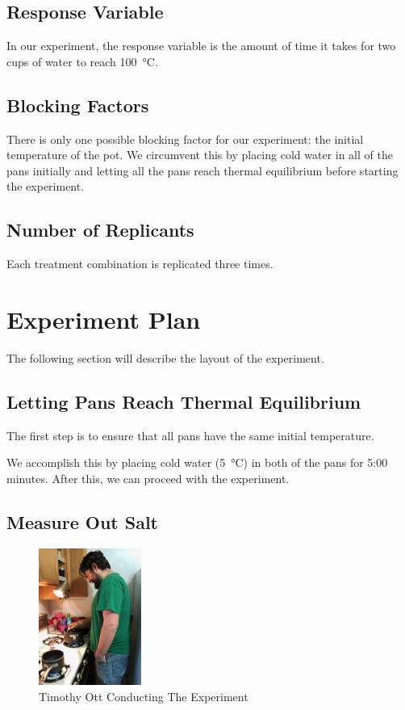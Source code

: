 \documentclass[12pt,titlepage=false]{scrartcl}
\begin{document}
\subsection{Response Variable}
\label{sub:response_variable}
In our experiment, the response variable is the amount of time it takes for two cups of water to reach \SI{100}{\degreeCelsius}.

\subsection{Blocking Factors}
\label{sub:blocking_factors}
There is only one possible blocking factor for our experiment: the initial temperature of the pot. We circumvent this by placing cold water in all of the pans initially and letting all the pans reach thermal equilibrium before starting the experiment.

\subsection{Number of Replicants}
\label{sub:number_of_replicants}
Each treatment combination is replicated three times.

\section{Experiment Plan}
\label{sec:experiment_plan}
The following section will describe the layout of the experiment.

\subsection{Letting Pans Reach Thermal Equilibrium}
\label{sub:letting_pans_reach_thermal_equilibrium}

The first step is to ensure that all pans have the same initial temperature.

We accomplish this by placing cold water (\SI{5}{\degreeCelsius}) in both of the pans for 5:00 minutes. After this, we can proceed with the experiment.

\subsection{Measure Out Salt}
\label{sub:measure_out_salt}
\begin{figure}
    \begin{center}
        \includegraphics[width=0.30\textwidth]{tim}
    \end{center}
    \caption{Timothy Ott Conducting The Experiment}
\end{figure}
\end{document}
